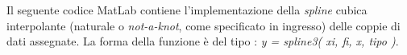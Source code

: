 Il seguente codice MatLab contiene l'implementazione della \textit{spline} cubica interpolante (naturale o \textit{not-a-knot}, come specificato in ingresso) delle coppie di dati assegnate. La forma della funzione è del tipo : \textit{y = spline3( xi, fi, x, tipo )}.\\\
